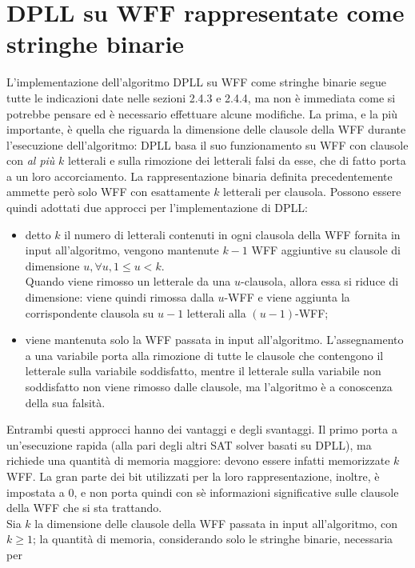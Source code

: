 \section{DPLL su WFF rappresentate come stringhe binarie}
L'implementazione dell'algoritmo DPLL su WFF come stringhe binarie segue tutte le 
indicazioni date nelle sezioni 2.4.3 e 2.4.4, ma non è immediata come si potrebbe pensare ed è 
necessario effettuare alcune modifiche.
La prima, e la più importante, è quella che riguarda la dimensione delle clausole della 
WFF durante l'esecuzione dell'algoritmo: DPLL basa il suo funzionamento su WFF con 
clausole con \textit{al più} $k$ letterali e sulla rimozione dei letterali falsi da 
esse, che di fatto porta a un loro accorciamento.
La rappresentazione binaria definita precedentemente ammette però solo WFF con esattamente $k$ letterali 
per clausola.
Possono essere quindi adottati due approcci per l'implementazione di DPLL:
\begin{itemize}
    \item detto $k$ il numero di letterali contenuti in ogni clausola della WFF fornita in
    input all'algoritmo, vengono mantenute $k-1$ WFF aggiuntive su clausole di dimensione
    $u, \forall u, 1 \le u < k$.\\
    Quando viene rimosso un letterale da una $u$-clausola, allora essa si riduce di 
    dimensione: viene quindi rimossa dalla $u$-WFF e viene aggiunta la corrispondente clausola
    su $u-1$ letterali alla $(u-1)$-WFF;
    \item viene mantenuta solo la WFF passata in input all'algoritmo.
    L'assegnamento a una variabile porta alla rimozione di tutte le clausole che
    contengono il letterale sulla variabile soddisfatto, mentre il letterale sulla
    variabile non soddisfatto non viene rimosso dalle clausole, ma l'algoritmo è a
    conoscenza della sua falsità.
\end{itemize}
Entrambi questi approcci hanno dei vantaggi e degli svantaggi.
Il primo porta a un'esecuzione rapida (alla pari degli altri SAT solver basati su DPLL),
ma richiede una quantità di memoria maggiore: devono essere infatti memorizzate $k$ WFF.
La gran parte dei bit utilizzati per la loro rappresentazione, inoltre, è impostata a 0, e
non porta quindi con sè informazioni significative sulle clausole della WFF che si sta
trattando.\\
Sia $k$ la dimensione delle clausole della WFF passata in input all'algoritmo, con $k \ge
1$; la quantità di memoria, considerando solo le stringhe binarie, necessaria per
